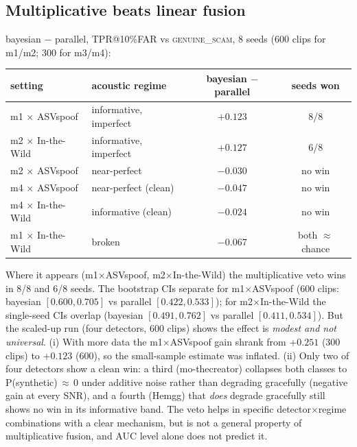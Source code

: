 \documentclass[11pt]{article}
\begin{document}
\subsection{Multiplicative beats linear fusion}\label{sec:c2}
bayesian $-$ parallel, TPR@10\%FAR vs \textsc{genuine\_scam}, 8 seeds (600 clips for m1/m2; 300 for m3/m4):
\begin{center}\small
\begin{tabular}{llcc}
\toprule
setting & acoustic regime & bayesian $-$ parallel & seeds won \\
\midrule
m1 $\times$ ASVspoof & informative, imperfect & $+0.123$ & 8/8 \\
m2 $\times$ In-the-Wild & informative, imperfect & $+0.127$ & 6/8 \\
m2 $\times$ ASVspoof & near-perfect & $-0.030$ & no win \\
m4 $\times$ ASVspoof & near-perfect (clean) & $-0.047$ & no win \\
m4 $\times$ In-the-Wild & informative (clean) & $-0.024$ & no win \\
m1 $\times$ In-the-Wild & broken & $-0.067$ & both $\approx$ chance \\
\bottomrule
\end{tabular}
\end{center}
Where it appears (m1$\times$ASVspoof, m2$\times$In-the-Wild) the multiplicative veto wins
in 8/8 and 6/8 seeds. The bootstrap CIs separate for m1$\times$ASVspoof (600 clips:
bayesian $[0.600,0.705]$ vs parallel $[0.422,0.533]$); for m2$\times$In-the-Wild the
single-seed CIs overlap (bayesian $[0.491,0.762]$ vs parallel $[0.411,0.534]$). But the scaled-up run (four
detectors, 600 clips) shows the effect is \emph{modest and not universal}. (i) With more
data the m1$\times$ASVspoof gain shrank from $+0.251$ (300 clips) to $+0.123$ (600), so the
small-sample estimate was inflated. (ii) Only two of four detectors show a clean win: a
third (mo-thecreator) collapses both classes to P(synthetic)\,$\approx$\,0 under additive
noise rather than degrading gracefully (negative gain at every SNR), and a fourth (Hemgg)
that \emph{does} degrade gracefully still shows no win in its informative band. The veto
helps in specific detector$\times$regime combinations with a clear mechanism, but is not a
general property of multiplicative fusion, and AUC level alone does not predict it.
\end{document}
